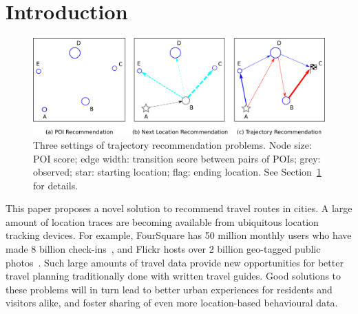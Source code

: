 
\section{Introduction}
\label{sec:intro}

\begin{figure}[ht]
	\centering
	\includegraphics[width=\columnwidth]{fig/fig1-flavours.png}
	\caption{Three settings of trajectory recommendation problems. 
Node size: POI score; edge width: transition score between pairs of POIs; 
grey: observed;
star: starting location; flag: ending location. See Section~\ref{sec:intro} for details.
}
	\label{fig:threesettings}
\end{figure}



This paper proposes a novel solution to recommend travel routes in cities.
A large amount of location traces are becoming available from ubiquitous location tracking devices.
For example, FourSquare
has 50 million monthly users who have made 8 billion check-ins~\cite{4sq},
and Flickr
hosts over 2 billion geo-tagged public photos~\cite{flickr}. 
Such large amounts of travel data provide new opportunities for better
travel planning traditionally done with written travel guides.
Good solutions to these problems will in turn lead to better urban experiences for residents and visitors alike, and foster sharing of even more location-based behavioural data.
